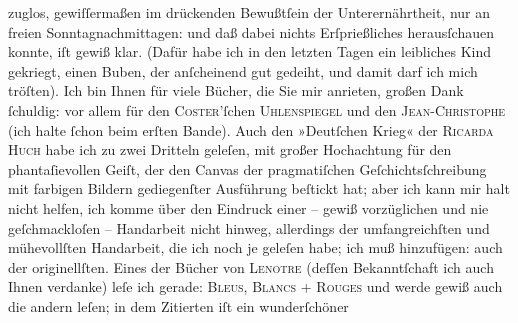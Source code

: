 \begin{ledgroupsized}[t]{13cm}
               zuglos, gewiſſermaßen  im drückenden
               Bewußtſein der Unterernährtheit, nur an freien Sonntagnachmittagen: und daß dabei
               nichts Erſprießliches herausſchauen konnte, iſt gewiß klar.\pend
           \pstart
           (Dafür habe ich in den letzten Tagen ein leibliches Kind gekriegt, einen Buben, der anſcheinend gut gedeiht,
               und damit darf ich mich tröſten).\pend
           \pstart
           Ich bin Ihnen für viele Bücher, die Sie mir anrieten, großen Dank ſchuldig: vor allem
               für den \textsc{Coster}’ſchen \textsc{Uhlenspiegel} und den \textsc{Jean-Christophe} (ich halte ſchon beim erſten Bande). Auch den »Deutſchen Krieg« der \textsc{Ricarda Huch} habe ich zu zwei Dritteln geleſen, mit großer Hochachtung für den
               phantaſievollen Geiſt, der den Canvas der pragmatiſchen Geſchichtsſchreibung mit {\pb}farbigen Bildern gediegenſter Ausführung beſtickt hat;
               aber ich kann mir halt nicht helfen, ich komme über den Eindruck einer – gewiß
               vorzüglichen und nie geſchmackloſen – Handarbeit nicht  hinweg, allerdings der umfangreichſten und mühevollſten Handarbeit,
               die ich noch je geleſen habe; ich muß hinzufügen: auch der originellſten.\pend
           \pstart
           Eines der Bücher von \textsc{Lenotre} (deſſen Bekanntſchaft ich auch Ihnen verdanke) leſe ich gerade: \textsc{Bleus, Blancs + Rouges} und werde gewiß auch die andern leſen; in dem Zitierten iſt ein wunderſchöner

\end{ledgroupsized}

